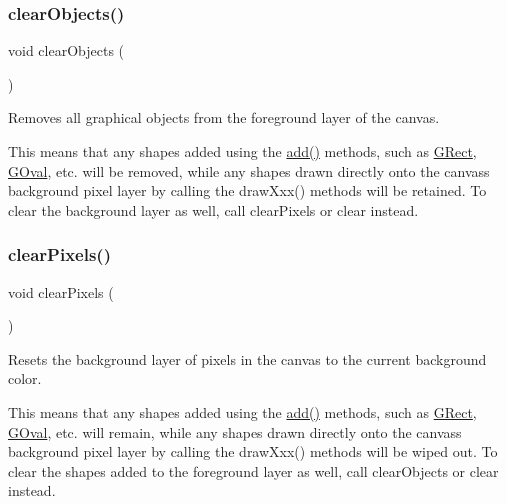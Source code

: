 \subsubsection{\texorpdfstring{clear\+Objects()}{clearObjects()}}
{\footnotesize\ttfamily void clear\+Objects (\begin{DoxyParamCaption}{ }\end{DoxyParamCaption})\hspace{0.3cm}{\ttfamily [virtual]}}



Removes all graphical objects from the foreground layer of the canvas. 

This means that any shapes added using the \mbox{\hyperlink{classsgl_1_1GCanvas_afe8277e7b2627513c6f7452fb0b2847d}{add()}} methods, such as \mbox{\hyperlink{classsgl_1_1GRect}{G\+Rect}}, \mbox{\hyperlink{classsgl_1_1GOval}{G\+Oval}}, etc. will be removed, while any shapes drawn directly onto the canvas\textquotesingle{}s background pixel layer by calling the draw\+Xxx() methods will be retained. To clear the background layer as well, call clear\+Pixels or clear instead. \mbox{\label{classsgl_1_1GCanvas_ab2c8590176aec1da6fb4e9b836bab630}} 
\subsubsection{\texorpdfstring{clear\+Pixels()}{clearPixels()}}
{\footnotesize\ttfamily void clear\+Pixels (\begin{DoxyParamCaption}{ }\end{DoxyParamCaption})\hspace{0.3cm}{\ttfamily [virtual]}}



Resets the background layer of pixels in the canvas to the current background color. 

This means that any shapes added using the \mbox{\hyperlink{classsgl_1_1GCanvas_afe8277e7b2627513c6f7452fb0b2847d}{add()}} methods, such as \mbox{\hyperlink{classsgl_1_1GRect}{G\+Rect}}, \mbox{\hyperlink{classsgl_1_1GOval}{G\+Oval}}, etc. will remain, while any shapes drawn directly onto the canvas\textquotesingle{}s background pixel layer by calling the draw\+Xxx() methods will be wiped out. To clear the shapes added to the foreground layer as well, call clear\+Objects or clear instead. \mbox{\label{classsgl_1_1GDrawingSurface_a221b3e75bb3d9d0bfea62b3364e6773b}} 
